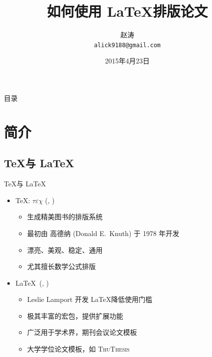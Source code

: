 \documentclass[xcolor=table,dvipsnames,svgnames]{beamer}
\title
{如何使用 \LaTeX 排版论文}
\author[alick] %
{赵涛\\ \texttt{alick9188@gmail.com}}
\institute[GitHub] %
{
  清华大学电子系网络融合实验室
}
\date[图书馆专题培训讲座] %
{2015年4月23日}
\newcommand{\ThuThesis}{\textsc{ThuThesis}\xspace}
\begin{document}
\begin{frame}
  \titlepage
\end{frame}

\begin{frame}{目录}
  \tableofcontents
\end{frame}




\section{简介}

\subsection{\TeX 与 \LaTeX}

\begin{frame}[fragile]{\TeX 与 \LaTeX}
  \begin{itemize}
    \item \TeX: $\tau\varepsilon\chi$ (,
      )
      \begin{itemize}
         \item 生成精美图书的排版系统
         \item 最初由 高德纳 (Donald E.~Knuth) 于 1978 年开发
         \item 漂亮、美观、稳定、通用
         \item 尤其擅长数学公式排版
       \end{itemize}
    \item \LaTeX\ (, )
      \begin{itemize}
        \item Leslie Lamport 开发 \LaTeX 降低使用门槛
        \item 极其丰富的宏包，提供扩展功能
        \item 广泛用于学术界，期刊会议论文模板
        \item 大学学位论文模板，如 \ThuThesis
      \end{itemize}
  \end{itemize}
\end{frame}
\end{document}
